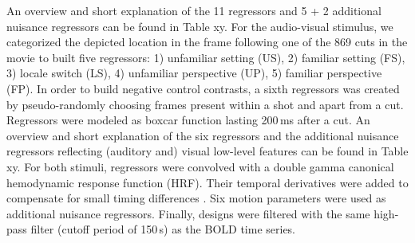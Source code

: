 \documentclass[english]{article}
\begin{document}
An overview and short explanation of the 11 regressors and 5 + 2 additional nuisance regressors can be found in Table xy.
For the audio-visual stimulus, we categorized the depicted location in the frame following one of the 869 cuts in the movie to built five regressors: 1) unfamiliar setting (US), 2) familiar setting (FS), 3) locale switch (LS), 4) unfamiliar perspective (UP), 5) familiar perspective (FP).
In order to build negative control contrasts, a sixth regressors was created by pseudo-randomly choosing frames present within a shot and apart from a cut. Regressors were modeled as boxcar function lasting 200\,ms after a cut.
An overview and short explanation of the six regressors and the additional nuisance regressors reflecting (auditory and) visual low-level features can be found in Table xy.
For both stimuli, regressors were convolved with a double gamma canonical hemodynamic response function (HRF).
Their temporal derivatives were added to compensate for small timing differences \citep{friston1998event}.
Six motion parameters were used as additional nuisance regressors. Finally, designs were filtered with the same high-pass filter (cutoff period of 150\,s) as the BOLD time series.
\end{document}
